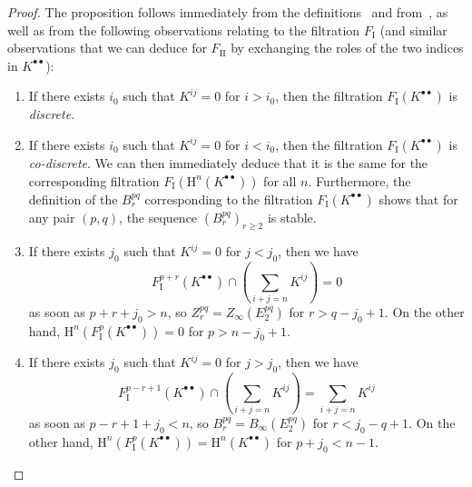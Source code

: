 \documentclass[oneside]{amsart}
\theoremstyle{ega-env-style}
\theoremstyle{ega-thm-env-style}
\theoremstyle{ega-defn-env-style}
\def\geq{\geqslant}                 %
\def\HH{\mathrm{H}}                 %
\newcommand{\oldpage}[2][]{{\marginnote{\normalfont{\textbf{#1}~|~#2}}}\ignorespaces}
\begin{document}
\begin{proof}
The proposition follows immediately from the definitions~ and from~, as well as from the following observations relating to the filtration $F_\mathrm{I}$ (and similar observations that we can deduce for $F_\mathrm{II}$ by exchanging the roles of the two indices in $K^{\bullet\bullet}$):
\begin{enumerate}
  \item[{$1^{\circ}$}] If there exists $i_0$ such that $K^{ij}=0$ for $i>i_0$, then the filtration $F_\mathrm{I}(K^{\bullet\bullet})$ is \emph{discrete}.
  \item[{$2^{\circ}$}] If there exists $i_0$ such that $K^{ij}=0$ for $i<i_0$, then the filtration $F_\mathrm{I}(K^{\bullet\bullet})$ is \emph{co-discrete}.
    We can then immediately deduce that it is the same for the corresponding filtration $F_\mathrm{I}(\HH^n(K^{\bullet\bullet}))$ for all $n$.
    Furthermore, the definition of the $B_{r}^{pq}$ corresponding to the filtration $F_\mathrm{I}(K^{\bullet\bullet})$  shows that for any pair $(p,q)$, the sequence $(B_{r}^{pq})_{r\geq 2}$ is stable.
  \item[{$3^{\circ}$}] If there exists $j_0$ such that $K^{ij}=0$ for $j<j_0$, then we have 
    \[
      F_\mathrm{I}^{p+r}(K^{\bullet\bullet})
      \cap (\sum_{i+j=n}K^{ij})
      = 0
    \]
    as soon as $p+r+j_{0}>n$, so $Z_{r}^{pq} = Z_\infty(E_2^{pq})$ for $r>q-j_{0}+1$.
    On the other hand, $\HH^{n}(F_\mathrm{I}^{p}(K^{\bullet\bullet})) = 0$ for $p>n-j_{0}+1$.
  \item[{$4^{\circ}$}] If there exists $j_0$ such that $K^{ij}=0$ for $j>j_0$, then we have 
    \[
      F_\mathrm{I}^{p-r+1}(K^{\bullet\bullet})
      \cap (\sum_{i+j=n}K^{ij})
      = \sum_{i+j=n}K^{ij}
    \]
    \oldpage[0\textsubscript{III}]{31}
    as soon as $p-r+1+j_{0}<n$, so $B_{r}^{pq} = B_\infty(E_2^{pq})$ for $r<j_{0}-q+1$.
    On the other hand, $\HH^{n}(F_\mathrm{I}^{p}(K^{\bullet\bullet})) = \HH^{n}(K^{\bullet\bullet})$ for $p+j_{0}<n-1$.
\end{enumerate}
\end{proof}
\end{document}
